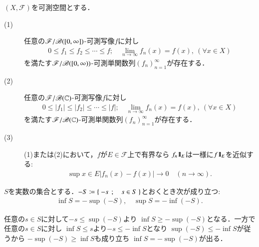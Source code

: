 	\begin{screen}
		\begin{thm}[単関数近似列の存在]
			$(X,\mathscr{F})$を可測空間とする．
			\begin{description} 
				\item[(1)] 任意の$\mathscr{F}/\mathscr{B}([0,\infty])$-可測写像$f$に対し
					\begin{align}
						0 \leq f_1 \leq f_2 \leq \cdots \leq f;
						\quad \lim_{n \to \infty} f_n(x) = f(x),\ (\forall x \in X)
					\end{align}
					を満たす$\mathscr{F}/\mathscr{B}([0,\infty))$-可測単関数列$(f_n)_{n=1}^\infty$が存在する．
					
				\item[(2)]
					 任意の$\mathscr{F}/\mathscr{B}(\mathbb{C})$-可測写像$f$に対し
					\begin{align}
						0 \leq |f_1| \leq |f_2| \leq \cdots \leq |f|;
						\quad \lim_{n \to \infty} f_n(x) = f(x),\ (\forall x \in X)
					\end{align}
					を満たす$\mathscr{F}/\mathscr{B}(\mathbb{C})$-可測単関数列$(f_n)_{n=1}^\infty$が存在する．
				
				\item[(3)] (1)または(2)において，$f$が$E \in \mathscr{F}$上で有界なら
					$f_n \mbox{1}\hspace{-0.25em}\mbox{l}_E$は一様に$f \mbox{1}\hspace{-0.25em}\mbox{l}_E$を近似する:
					\begin{align}
						\sup{x \in E}{\left| f_n(x) - f(x) \right|} \longrightarrow 0
						\quad (n \longrightarrow \infty).
					\end{align}
			\end{description}
		\end{thm}
	\end{screen}
		
	\begin{screen}
		\begin{lem}
			$S$を実数の集合とする．$-S \coloneqq \left\{\ -s\ \, ; \quad s \in S\ \right\}$とおくとき次が成り立つ:
			\begin{align}
				\inf{}{S} = -\sup{}{(-S)},
				\quad \sup{}{S} = -\inf{}{(-S)}.
			\end{align}
		\end{lem}
	\end{screen}
	
	\begin{prf}
		任意の$s \in S$に対して$-s \leq \sup{}{(-S)}$より
		$\inf{}{S} \geq -\sup{}{(-S)}$となる．一方で任意の$s \in S$に対し
		$\inf{}{S} \leq s$より$-s \leq -\inf{}{S}$となり
		$\sup{}{(-S)} \leq -\inf{}{S}$が従うから
		$-\sup{}{(-S)} \geq \inf{}{S}$も成り立ち
		$\inf{}{S} = -\sup{}{(-S)}$が出る．
		\QED
	\end{prf}
	
